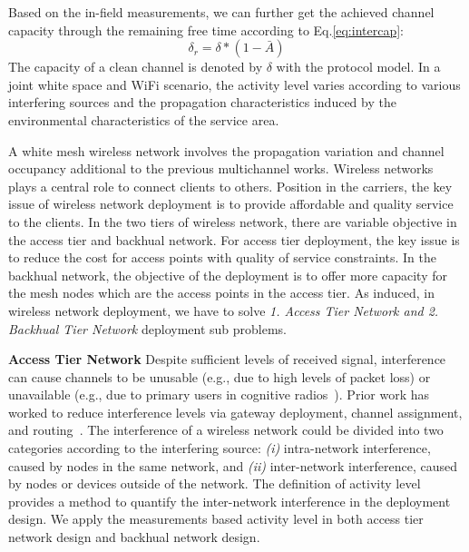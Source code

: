 Based on the in-field measurements, we can further get the achieved channel capacity through the remaining
free time according to Eq.\ref{eq:intercap}:
\begin{equation}
\label{eq:intercap}
\delta_r=\delta*(1-\bar{A})
\end{equation}
The capacity of a clean channel is denoted by $\delta$ with the protocol model. In a joint white space and 
WiFi scenario, the activity level varies according to various interfering sources and the propagation 
characteristics induced by the environmental characteristics of the service area.

A white mesh wireless network involves the propagation variation and channel occupancy additional to 
the previous multichannel works. Wireless networks plays a central role to connect clients to others.
Position in the carriers, the key issue of wireless network deployment is to provide affordable and 
quality service to the clients. In the two tiers of wireless network, there are variable objective in
the access tier and backhual network. For access tier deployment, the key issue is to reduce the cost 
for access points with quality of service constraints. In the backhual network, the objective of the 
deployment is to offer more capacity for the mesh nodes which are the access points in the access tier. 
As induced, in wireless network deployment, we have to solve \emph{1. Access Tier Network and
2. Backhual Tier Network} deployment sub problems. 

\textbf{Access Tier Network} Despite sufficient levels of received signal, interference can cause channels 
to be unusable (e.g., due to high levels of packet loss) or unavailable (e.g., due to primary users in 
cognitive radios~\cite{haykin2005cognitive}). Prior work has worked to reduce interference levels via gateway 
deployment, channel assignment, and routing~\cite{he2008optimizing,tang2005interference}. The interference 
of a wireless network could be divided into two categories according to the interfering source: {\it (i)} 
intra-network interference, caused by nodes in the same network, and {\it (ii)} inter-network interference, 
caused by nodes or devices outside of the network. The definition of activity level provides a method to 
quantify the inter-network interference in the deployment design. We apply the measurements based activity 
level in both access tier network design and backhual network design.

